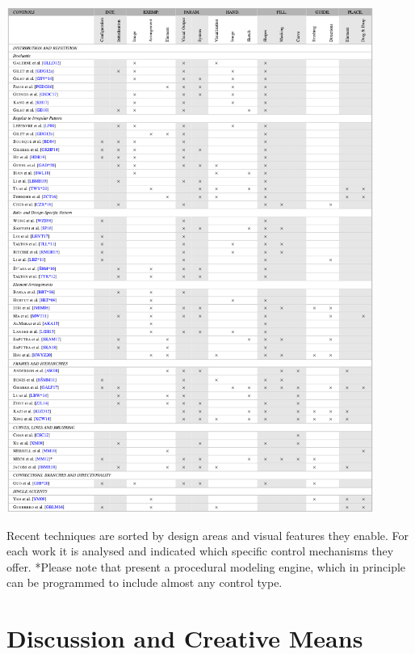 


\begin{table}
    \centering
    \includegraphics[width=0.9\textwidth]{tables/table_all.png}
    \caption[Control mechanisms in the state of the art]{Recent techniques are sorted by design areas and visual features they enable. For each work it is analysed and indicated which specific control mechanisms they offer. *Please note that \cite{mech_2012_tdf} present a procedural modeling engine, which in principle can be programmed to include almost any control type.\label{table:analysis}}
\end{table}


\section{Discussion and Creative Means}
\label{sec:discussion_creative_means}

